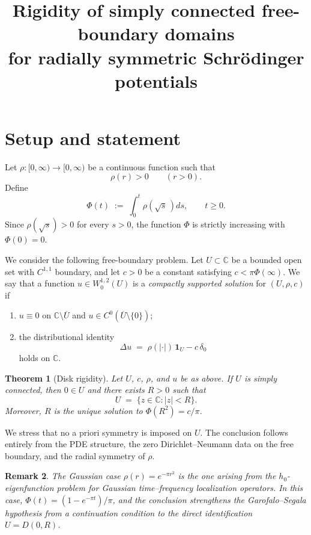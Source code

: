 \documentclass[11pt]{article}
\title{Rigidity of simply connected free-boundary domains\\
       for radially symmetric Schr\"{o}dinger potentials}
\author{}
\date{}
\newtheorem{theorem}{Theorem}[section]
\newtheorem{remark}[theorem]{Remark}
\newcommand{\C}{\mathbb{C}}
\newcommand{\1}{\mathbf{1}}
\begin{document}
\maketitle

\section{Setup and statement}

Let $\rho\colon[0,\infty)\to[0,\infty)$ be a continuous function such that
\[
  \rho(r)>0\qquad (r>0).
\]
Define
\begin{equation}\label{eq:Phi}
  \Phi(t) \;:=\; \int_0^t \rho\!\left(\sqrt{s}\,\right) ds, \qquad t\ge 0.
\end{equation}
Since $\rho(\sqrt{s})>0$ for every $s>0$, the function $\Phi$ is strictly increasing with
$\Phi(0)=0$.

We consider the following free-boundary problem.  Let $U\subset\C$ be a bounded open set with
$C^{1,1}$ boundary, and let $c>0$ be a constant satisfying $c < \pi \Phi(\infty)$.  We say
that a function $u\in W^{1,2}_0(U)$ is a \emph{compactly supported solution} for $(U,\rho,c)$
if
\begin{enumerate}[label=\textnormal{(\roman*)}]
  \item $u \equiv 0$ on $\C\setminus\overline{U}$ and $u \in C^0(\overline{U}\setminus\{0\})$;
  \item the distributional identity
    \begin{equation}\label{eq:PDE}
      \Delta u \;=\; \rho(|\cdot|)\,\1_U - c\,\delta_0
    \end{equation}
    holds on $\C$.
\end{enumerate}

\begin{theorem}[Disk rigidity]\label{thm:disk}
  Let $U$, $c$, $\rho$, and $u$ be as above.  If $U$ is simply connected, then $0\in U$ and
  there exists $R>0$ such that
  \[
    U \;=\; \{z\in\C : |z| < R\}.
  \]
  Moreover, $R$ is the unique solution to $\Phi(R^2)=c/\pi$.
\end{theorem}

We stress that no a priori symmetry is imposed on $U$.  The conclusion follows entirely from the
PDE structure, the zero Dirichlet--Neumann data on the free boundary, and the radial symmetry
of $\rho$.

\begin{remark}
  The Gaussian case $\rho(r)=e^{-\pi r^2}$ is the one arising from the $h_0$-eigenfunction
  problem for Gaussian time--frequency localization operators.  In this case,
  $\Phi(t)=(1-e^{-\pi t})/\pi$, and the conclusion strengthens the Garofalo--Segala hypothesis
  from a continuation condition to the direct identification $U=D(0,R)$.
\end{remark}
\end{document}
